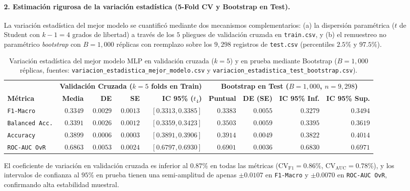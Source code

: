 \documentclass[11pt,a4paper]{article}
\newcommand{\code}[1]{\texttt{\small #1}}
\begin{document}
\paragraph{2. Estimación rigurosa de la variación estadística (5-Fold CV y Bootstrap en Test).}
La variación estadística del mejor modelo se cuantificó mediante dos mecanismos complementarios: (a) la dispersión paramétrica ($t$ de Student con $k-1=4$ grados de libertad) a través de los $5$ pliegues de validación cruzada en \code{train.csv}, y (b) el remuestreo no paramétrico \textit{bootstrap} con $B = 1{,}000$ réplicas con reemplazo sobre los $9{,}298$ registros de \code{test.csv} (percentiles $2.5\%$ y $97.5\%$).

\begin{table}[H]
\centering
\caption{Variación estadística del mejor modelo MLP en validación cruzada ($k=5$) y en prueba mediante Bootstrap ($B=1{,}000$ réplicas, fuentes: \code{variacion\_estadistica\_mejor\_modelo.csv} y \code{variacion\_estadistica\_test\_bootstrap.csv}).}
\footnotesize
\setlength{\tabcolsep}{3.2pt}
\begin{tabularx}{\textwidth}{>{\raggedright\arraybackslash}X rrrrrrrr}
\toprule
& \multicolumn{4}{c}{\textbf{Validación Cruzada ($k=5$ folds en Train)}} & \multicolumn{4}{c}{\textbf{Bootstrap en Test ($B=1{,}000$, $n=9{,}298$)}} \\
\cmidrule(lr){2-5} \cmidrule(lr){6-9}
\textbf{Métrica} & \textbf{Media} & \textbf{DE} & \textbf{SE} & \textbf{IC 95\% ($t_4$)} & \textbf{Puntual} & \textbf{DE (SE)} & \textbf{IC 95\% Inf.} & \textbf{IC 95\% Sup.} \\
\midrule
\code{F1-Macro}          & $0.3349$ & $0.0029$ & $0.0013$ & $[0.3313, 0.3385]$ & $0.3383$ & $0.0055$ & $0.3279$ & $0.3494$ \\
\code{Balanced Acc.}     & $0.3391$ & $0.0026$ & $0.0012$ & $[0.3359, 0.3423]$ & $0.3503$ & $0.0059$ & $0.3395$ & $0.3619$ \\
\code{Accuracy}          & $0.3899$ & $0.0006$ & $0.0003$ & $[0.3891, 0.3906]$ & $0.3914$ & $0.0049$ & $0.3822$ & $0.4014$ \\
\code{ROC-AUC OvR}       & $0.6863$ & $0.0053$ & $0.0024$ & $[0.6797, 0.6930]$ & $0.6901$ & $0.0036$ & $0.6830$ & $0.6971$ \\
\bottomrule
\end{tabularx}
\end{table}

El coeficiente de variación en validación cruzada es inferior al $0.87\%$ en todas las métricas ($\text{CV}_{\text{F1}} = 0.86\%$, $\text{CV}_{\text{AUC}} = 0.78\%$), y los intervalos de confianza al $95\%$ en prueba tienen una semi-amplitud de apenas $\pm 0.0107$ en \code{F1-Macro} y $\pm 0.0070$ en \code{ROC-AUC OvR}, confirmando alta estabilidad muestral.
\end{document}
